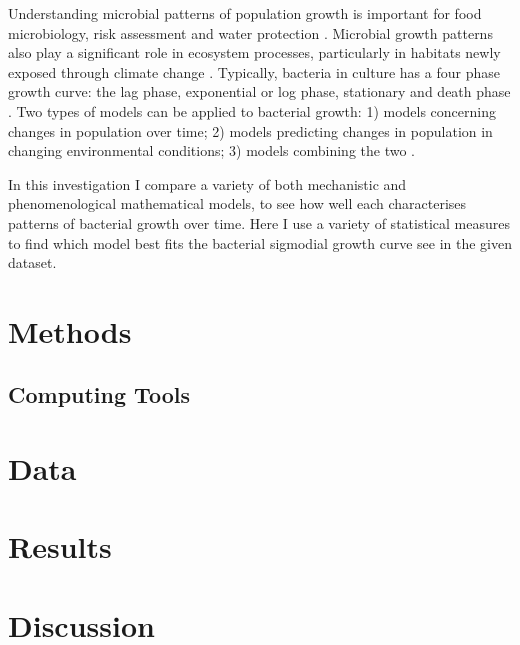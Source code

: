 \documentclass{article}
\begin{document}
\indent Understanding microbial patterns of population growth is important for food microbiology, risk assessment and water protection \cite{zwietering1990modeling} \cite{nauta2002modelling} \cite{dukan1996dynamic}. Microbial growth patterns also play a significant role in ecosystem processes, particularly in habitats newly exposed through climate change \cite{bradley2017microbial}. Typically, bacteria in culture has a four phase growth curve: the lag phase, exponential or log phase, stationary and death phase \cite{al2008studying}. Two types of models can be applied to bacterial growth: 1) models concerning changes in population over time; 2) models predicting changes in population in changing environmental conditions; 3) models combining the two \cite{whiting1995microbial}. \

\indent  In this investigation I compare a variety of both mechanistic and phenomenological mathematical models, to see how well each characterises patterns of bacterial growth over time. Here I use a variety of statistical measures to find which model best fits the bacterial sigmodial growth curve see in the given dataset.

\section{Methods}

\subsection{Computing Tools}

\section{Data}

\section{Results}

\section{Discussion}




\end{document}
